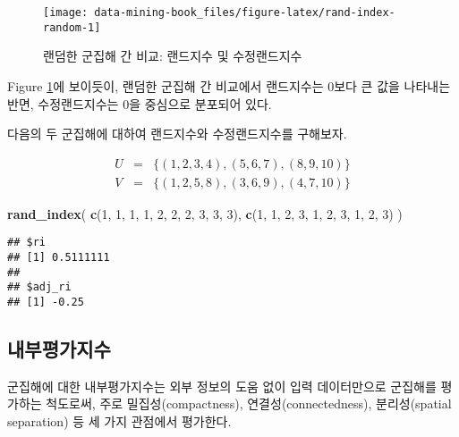 \documentclass[]{book}
\newenvironment{Shaded}{\begin{snugshade}}{\end{snugshade}}
\newcommand{\DecValTok}[1]{\textcolor[rgb]{0.00,0.00,0.81}{#1}}
\newcommand{\KeywordTok}[1]{\textcolor[rgb]{0.13,0.29,0.53}{\textbf{#1}}}
\newcommand{\NormalTok}[1]{#1}
\begin{document}
\begin{figure}

{\centering \texttt{[image: data-mining-book\_files/figure-latex/rand-index-random-1]} 

}

\caption{랜덤한 군집해 간 비교: 랜드지수 및 수정랜드지수}\label{fig:rand-index-random}
\end{figure}

Figure \ref{fig:rand-index-random}에 보이듯이, 랜덤한 군집해 간 비교에서 랜드지수는 0보다 큰 값을 나타내는 반면, 수정랜드지수는 0을 중심으로 분포되어 있다.

다음의 두 군집해에 대하여 랜드지수와 수정랜드지수를 구해보자.

\begin{eqnarray*}
U &=& \{(1, 2, 3, 4), (5, 6, 7), (8, 9, 10) \}\\
V &=& \{(1, 2, 5, 8), (3, 6, 9), (4, 7, 10) \}
\end{eqnarray*}

\begin{Shaded}
\begin{Highlighting}[]
\KeywordTok{rand_index}\NormalTok{(}
  \KeywordTok{c}\NormalTok{(}\DecValTok{1}\NormalTok{, }\DecValTok{1}\NormalTok{, }\DecValTok{1}\NormalTok{, }\DecValTok{1}\NormalTok{, }\DecValTok{2}\NormalTok{, }\DecValTok{2}\NormalTok{, }\DecValTok{2}\NormalTok{, }\DecValTok{3}\NormalTok{, }\DecValTok{3}\NormalTok{, }\DecValTok{3}\NormalTok{),}
  \KeywordTok{c}\NormalTok{(}\DecValTok{1}\NormalTok{, }\DecValTok{1}\NormalTok{, }\DecValTok{2}\NormalTok{, }\DecValTok{3}\NormalTok{, }\DecValTok{1}\NormalTok{, }\DecValTok{2}\NormalTok{, }\DecValTok{3}\NormalTok{, }\DecValTok{1}\NormalTok{, }\DecValTok{2}\NormalTok{, }\DecValTok{3}\NormalTok{)}
\NormalTok{)}
\end{Highlighting}
\end{Shaded}

\begin{verbatim}
## $ri
## [1] 0.5111111
## 
## $adj_ri
## [1] -0.25
\end{verbatim}

\hypertarget{cluster-evaluation-internal-index}{%
\subsection{내부평가지수}\label{cluster-evaluation-internal-index}}

군집해에 대한 내부평가지수는 외부 정보의 도움 없이 입력 데이터만으로 군집해를 평가하는 척도로써, 주로 밀집성(compactness), 연결성(connectedness), 분리성(spatial separation) 등 세 가지 관점에서 평가한다.
\end{document}
